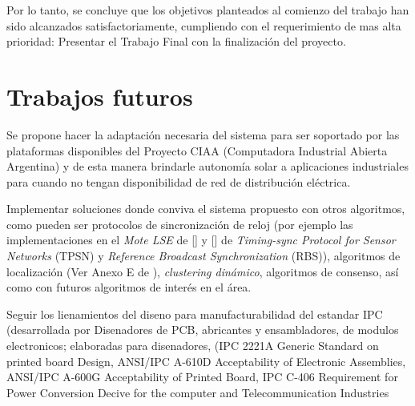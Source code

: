\medskip

Por lo tanto, se concluye que los objetivos planteados al comienzo del trabajo han sido alcanzados satisfactoriamente, cumpliendo con el requerimiento de mas alta prioridad: Presentar el Trabajo Final con la finalización del proyecto.

\section{Trabajos futuros}

Se propone hacer la adaptación necesaria del sistema para ser soportado por las plataformas disponibles del Proyecto CIAA \citep{CIAA} (Computadora Industrial Abierta Argentina) y de esta manera brindarle autonomía solar a aplicaciones industriales para cuando no tengan disponibilidad de red de distribución eléctrica.

Implementar soluciones donde conviva el sistema propuesto con otros algoritmos, como pueden ser protocolos de sincronización de reloj (por ejemplo las implementaciones en el \textit{Mote LSE} de [] y [] de \textit{Timing-sync Protocol for Sensor Networks} (TPSN) y \textit{Reference Broadcast Synchronization} (RBS)), algoritmos de localización (Ver Anexo E de \citep{802.15.4}), \textit{clustering dinámico}, algoritmos de consenso, así como con futuros algoritmos de interés en el área.

Seguir los lienamientos del diseno para manufacturabilidad del estandar IPC (desarrollada por Disenadores de PCB, abricantes y ensambladores, de modulos electronicos; elaboradas para disenadores, (IPC 2221A Generic Standard on printed board Design, ANSI/IPC A-610D Acceptability of Electronic Assemblies, ANSI/IPC A-600G Acceptability of Printed Board, IPC C-406 Requirement for Power Conversion Decive for the computer and Telecommunication Industries











